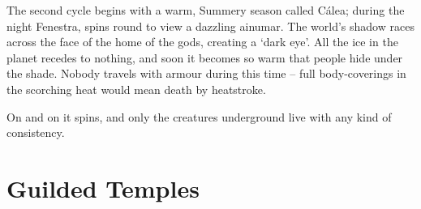 \begin{multicols}{2}
The second cycle begins with a warm, Summery season called C\'{a}lea; during the night Fenestra, spins round to view a dazzling \gls{ainumar}.
The world's shadow races across the face of the home of the gods, creating a `dark eye'.
All the ice in the planet recedes to nothing, and soon it becomes so warm that people hide under the shade.
Nobody travels with armour during this time -- full body-coverings in the scorching heat would mean death by heatstroke.

On and on it spins, and only the creatures underground live with any kind of consistency.

\end{multicols}

\section{Guilded Temples}


